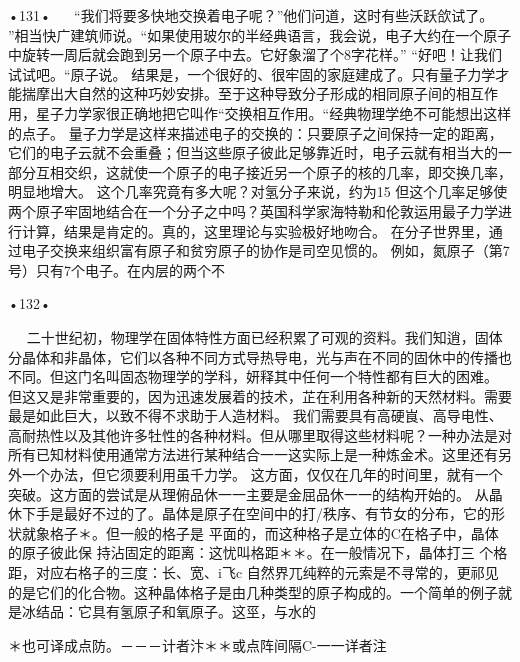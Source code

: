 •131•
  
“我们将要多快地交换着电子呢？”他们问道，这时有些沃跃欱试了。
”相当快广建筑师说。“如果使用玻尔的半经典语言，我会说，电子大约在一个原子中旋转一周后就会跑到另一个原子中去。它好象溜了个8字花样。”
“好吧！让我们试试吧。“原子说。
结果是，一个很好的、很牢固的家庭建成了。只有量子力学才能揣摩出大自然的这种巧妙安排。至于这种导致分子形成的相同原子间的相互作用，星子力学家很正确地把它叫作“交换相互作用。“经典物理学绝不可能想出这样的点子。
量子力学是这样来描述电子的交换的：只要原子之间保持一定的距离，它们的电子云就不会重叠；但当这些原子彼此足够靠近时，电子云就有相当大的一部分互相交织，这就使一个原子的电子接近另一个原子的核的几率，即交换几率，明显地增大。
这个几率究竟有多大呢？对氢分子来说，约为15%
但这个几率足够使两个原子牢固地结合在一个分子之中吗？英国科学家海特勒和伦敦运用最子力学进行计算，结果是肯定的。真的，这里理论与实验极好地吻合。
在分子世界里，通过电子交换来组织富有原子和贫穷原子的协作是司空见惯的。
例如，氮原子（第7号）只有7个电子。在内层的两个不

•132•
  











  
二十世纪初，物理学在固体特性方面已经积累了可观的资料。我们知逍，固体分晶体和非晶体，它们以各种不同方式导热导电，光与声在不同的固休中的传播也不同。但这门名叫固态物理学的学科，妍释其中任何一个特性都有巨大的困难。
但这又是非常重要的，因为迅速发展着的技术，芷在利用各种新的天然材料。需要最是如此巨大，以致不得不求助于人造材料。
我们需要具有高硬峎、高导电性、高耐热性以及其他许多牡性的各种材料。但从哪里取得这些材料呢？一种办法是对所有已知材料使用通常方法进行某种结合一一这实际上是一种炼金术。这里还有另外一个办法，但它须要利用虽千力学。
这方面，仅仅在几年的时间里，就有一个突破。这方面的尝试是从理俯品休一一主要是金屈品休一一的结构开始的。
从晶休下手是最好不过的了。晶体是原子在空间中的打/秩序、有节女的分布，它的形状就象格子＊。但一般的格子是
平面的，而这种格子是立体的C在格子中，晶体的原子彼此保
持沾固定的距离：这忧叫格距＊＊。在一般情况下，晶体打三
个格距，对应右格子的三度：长、宽、i飞c
自然界兀纯粹的元索是不寻常的，更祁见的是它们的化合物。这种晶体格子是由几种类型的原子构成的。一个简单的例子就是冰结品：它具有氢原子和氧原子。这巠，与水的

＊也可译成点防。－－－计者汴＊＊或点阵间隔C-一一详者注

